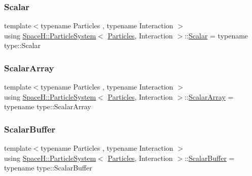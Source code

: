 \mbox{\label{class_space_h_1_1_particle_system_a522770dcfaf8b29aed35ea9348185a34}} 
\subsubsection{\texorpdfstring{Scalar}{Scalar}}
{\footnotesize\ttfamily template$<$typename Particles , typename Interaction $>$ \\
using \mbox{\hyperlink{class_space_h_1_1_particle_system}{Space\+H\+::\+Particle\+System}}$<$ \mbox{\hyperlink{struct_space_h_1_1_particles}{Particles}}, Interaction $>$\+::\mbox{\hyperlink{class_space_h_1_1_particle_system_a522770dcfaf8b29aed35ea9348185a34}{Scalar}} =  typename type\+::\+Scalar}

\mbox{\label{class_space_h_1_1_particle_system_a7c621641dbb2bb4192af568758ed07bb}} 
\subsubsection{\texorpdfstring{Scalar\+Array}{ScalarArray}}
{\footnotesize\ttfamily template$<$typename Particles , typename Interaction $>$ \\
using \mbox{\hyperlink{class_space_h_1_1_particle_system}{Space\+H\+::\+Particle\+System}}$<$ \mbox{\hyperlink{struct_space_h_1_1_particles}{Particles}}, Interaction $>$\+::\mbox{\hyperlink{class_space_h_1_1_particle_system_a7c621641dbb2bb4192af568758ed07bb}{Scalar\+Array}} =  typename type\+::\+Scalar\+Array}

\mbox{\label{class_space_h_1_1_particle_system_a71f8e04a3c8adc44b2a8b41e0cd55278}} 
\subsubsection{\texorpdfstring{Scalar\+Buffer}{ScalarBuffer}}
{\footnotesize\ttfamily template$<$typename Particles , typename Interaction $>$ \\
using \mbox{\hyperlink{class_space_h_1_1_particle_system}{Space\+H\+::\+Particle\+System}}$<$ \mbox{\hyperlink{struct_space_h_1_1_particles}{Particles}}, Interaction $>$\+::\mbox{\hyperlink{class_space_h_1_1_particle_system_a71f8e04a3c8adc44b2a8b41e0cd55278}{Scalar\+Buffer}} =  typename type\+::\+Scalar\+Buffer}


